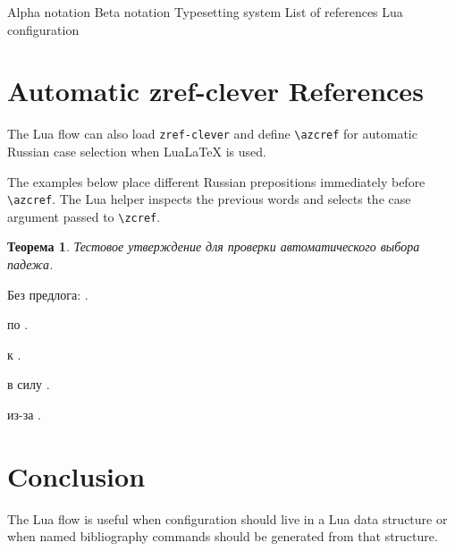 \documentclass{article}
\newtheorem{theorem}{Теорема}
\begin{document}
\index[notation]{$\alpha$} Alpha notation
\index[notation]{$\beta$} Beta notation
 Typesetting system
 List of references
 Lua configuration

\section{Automatic zref-clever References}

The Lua flow can also load \texttt{zref-clever} and define \verb|\azcref| for
automatic Russian case selection when LuaLaTeX is used.

The examples below place different Russian prepositions immediately before
\verb|\azcref|.  The Lua helper inspects the previous words and selects the case
argument passed to \verb|\zcref|.

\begin{otherlanguage}{russian}
\begin{theorem}
Тестовое утверждение для проверки автоматического выбора падежа.
\end{theorem}

Без предлога: .

по .

к .

в силу .

из-за .
\end{otherlanguage}

\section{Conclusion}
\label{sec:conclusion}

The Lua flow is useful when configuration should live in a Lua data structure or
when named bibliography commands should be generated from that structure.

\printbibliographymain
\printbibliographyonline

\printindexnotation
\printindex
\end{document}
